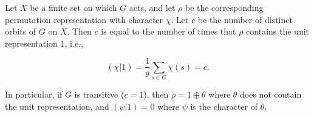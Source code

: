 Let $X$ be a finite set on which $G$ acts, and let $\rho$ be the corresponding permutation representation with character $\chi$. Let $c$ be the number of distinct orbits of $G$ on $X$. Then $c$ is equal to the number of times that $\rho$ contains the unit representation $1$, i.e.,

$$(\chi|1) = \frac{1}{g} \sum_{s \in G} \chi(s) = c.$$

In particular, if $G$ is transitive ($c = 1$), then $\rho = 1 \oplus \theta$ where $\theta$ does not contain the unit representation, and $(\psi|1) = 0$ where $\psi$ is the character of $\theta$.
